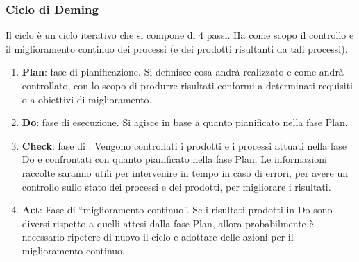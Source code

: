 \subsubsection{Ciclo di Deming} \label{AppPDCA}
Il ciclo  è un ciclo iterativo che si compone di 4 passi. Ha come scopo il controllo e il miglioramento continuo dei processi (e dei prodotti risultanti da tali processi). 
\begin{enumerate}
\item \textbf{Plan}: fase di pianificazione. Si definisce cosa andrà realizzato e come andrà controllato, con lo scopo di produrre risultati conformi a determinati requisiti o a obiettivi di miglioramento.
\item \textbf{Do}: fase di esecuzione. Si agisce in base a quanto pianificato nella fase Plan.
\item \textbf{Check}: fase di . Vengono controllati i prodotti e i processi attuati nella fase Do e confrontati con quanto pianificato nella fase Plan. Le informazioni raccolte saranno utili per intervenire in tempo in caso di errori, per avere un controllo sullo stato dei processi e dei prodotti, per migliorare i risultati.
\item \textbf{Act}: Fase di “miglioramento continuo”. Se i risultati prodotti in Do sono diversi rispetto a quelli attesi dalla fase Plan, allora probabilmente è necessario ripetere di nuovo il ciclo  e adottare delle azioni per il miglioramento continuo.
\end{enumerate}
